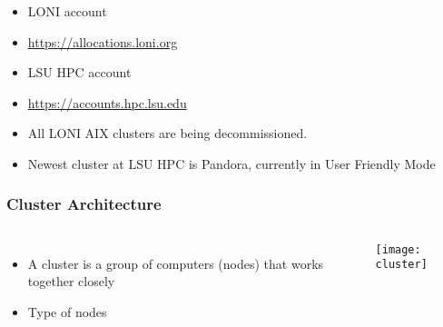 \documentclass[slidestop,mathserif,compress,xcolor=svgnames,table]{beamer}
\begin{document}
\begin{frame}
\begin{block}{}
\begin{itemize}
\item LONI account
\item[] \url{https://allocations.loni.org}
\item LSU HPC account
\item[] \url{https://accounts.hpc.lsu.edu}
\item All LONI AIX clusters are being decommissioned.
\item Newest cluster at LSU HPC is Pandora, currently in User Friendly Mode
\end{itemize}
\end{block}
\end{frame}

\begin{frame}
\frametitle{\small Cluster Architecture}
\begin{columns}
\column{4cm}
\begin{itemize}
\item A cluster is a group of computers (nodes) that works together closely
\item Type of nodes
\end{itemize}
\column{7cm}
\begin{center}
\texttt{[image: cluster]}
\end{center}
\end{columns}
\end{frame}
\end{document}
